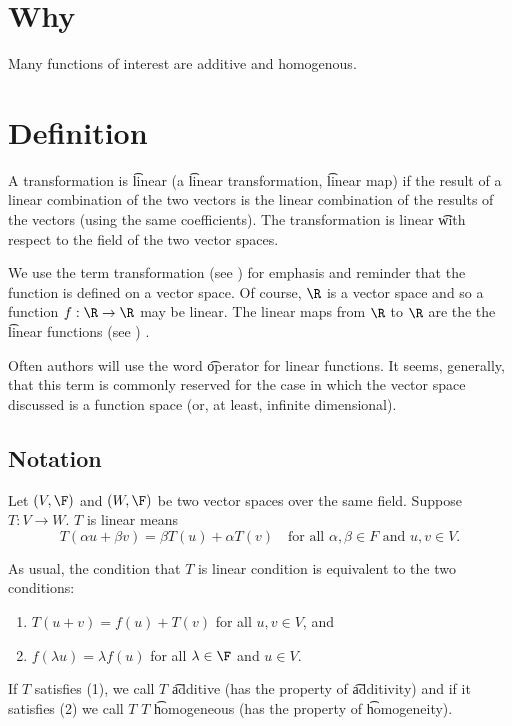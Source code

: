 
\section*{Why}

Many functions of interest are additive and homogenous.

\section*{Definition}

A transformation is \t{linear} (a \t{linear transformation}, \t{linear map}) if the result of a linear combination of the two vectors is the linear combination of the results of the vectors (using the same coefficients).
The transformation is linear \t{with respect to} the field of the two vector spaces.

We use the term transformation (see ) for emphasis and reminder that the function is defined on a vector space.
Of course, $\R $ is a vector space and so a function $f: \R \to \R $ may be linear.
The linear maps from $\R $ to $\R $ are the the \t{linear functions} (see ) .

Often authors will use the word \t{operator} for linear functions.
It seems, generally, that this term is commonly reserved for the case in which the vector space discussed is a function space (or, at least, infinite dimensional).

\subsection*{Notation}

Let $(V, \F )$ and $(W, \F )$ be two vector spaces over the same field.
Suppose $T: V \to W$.
$T$ is linear means
\[
T(\alpha u + \beta v) = \beta T(u) + \alpha T(v) \quad \text{for all } \alpha , \beta  \in F \text{ and } u, v \in V.
\]

As usual, the condition that $T$ is linear condition is equivalent to the two conditions:
    \begin{enumerate}
      \item $T(u + v) = f(u) + T(v)$ for all $u, v \in V$, and
      \item $f(\lambda u) = \lambda f(u)$ for all $\lambda  \in \F $ and $u \in V$.
    \end{enumerate}
If $T$ satisfies (1), we call $T$ \t{additive} (has the property of \t{additivity}) and if it satisfies (2) we call $T$ $T$ \t{homogeneous} (has the property of \t{homogeneity}).

